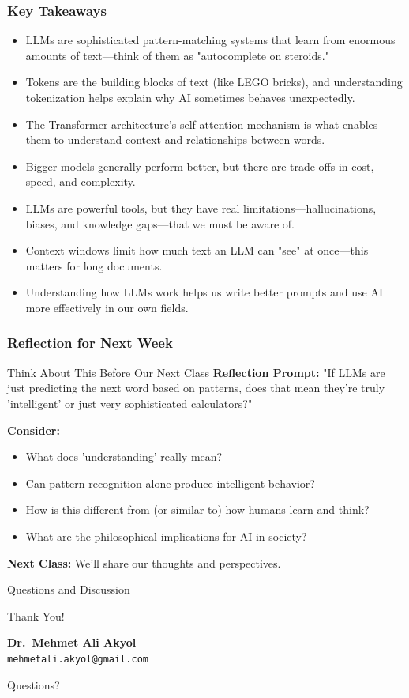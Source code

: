 \documentclass{beamer}
\begin{document}
\begin{frame}
    \frametitle{Key Takeaways}
    \begin{itemize}
        \item LLMs are sophisticated pattern-matching systems that learn from enormous amounts of text—think of them as "autocomplete on steroids."
        \item Tokens are the building blocks of text (like LEGO bricks), and understanding tokenization helps explain why AI sometimes behaves unexpectedly.
        \item The Transformer architecture's self-attention mechanism is what enables them to understand context and relationships between words.
        \item Bigger models generally perform better, but there are trade-offs in cost, speed, and complexity.
        \item LLMs are powerful tools, but they have real limitations—hallucinations, biases, and knowledge gaps—that we must be aware of.
        \item Context windows limit how much text an LLM can "see" at once—this matters for long documents.
        \item Understanding how LLMs work helps us write better prompts and use AI more effectively in our own fields.
    \end{itemize}
\end{frame}

\begin{frame}
    \frametitle{Reflection for Next Week}
    \begin{block}{Think About This Before Our Next Class}
        \textbf{Reflection Prompt:} "If LLMs are just predicting the next word based on patterns, does that mean they're truly 'intelligent' or just very sophisticated calculators?"
        
        \vspace{0.3cm}
        \textbf{Consider:}
        \begin{itemize}
            \item What does 'understanding' really mean?
            \item Can pattern recognition alone produce intelligent behavior?
            \item How is this different from (or similar to) how humans learn and think?
            \item What are the philosophical implications for AI in society?
        \end{itemize}
        \vspace{0.3cm}
        \textbf{Next Class:} We'll share our thoughts and perspectives.
    \end{block}
\end{frame}

\begin{frame}{Questions and Discussion}
    \begin{center}
    {\Huge Thank You!}
    \vspace{1cm}

    	\textbf{Dr.\ Mehmet Ali Akyol}\\
    	\texttt{mehmetali.akyol@gmail.com}
    \vspace{1cm}
    
    {\large Questions?}
    \end{center}
\end{frame}
\end{document}
